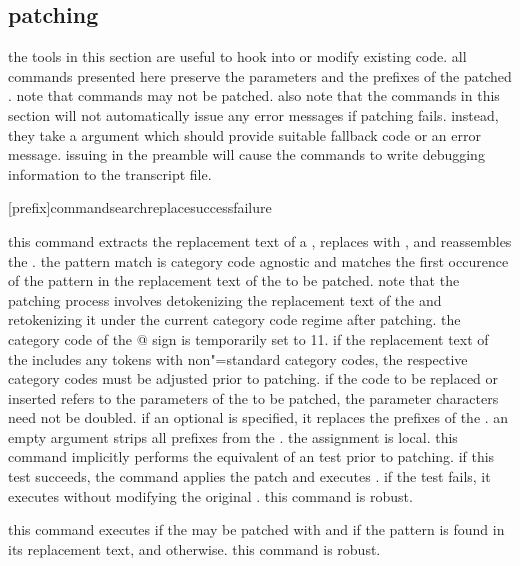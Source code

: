 \subsection{patching}
\label{aut:pat}

the tools in this section are useful to hook into or modify existing code. all commands presented here preserve the parameters and the prefixes of the patched . note that  commands may not be patched. also note that the commands in this section will not automatically issue any error messages if patching fails. instead, they take a  argument which should provide suitable fallback code or an error message. issuing  in the preamble will cause the commands to write debugging information to the transcript file.

\begin{ltxsyntax}

[prefix]{command}{search}{replace}{success}{failure}

this command extracts the replacement text of a , replaces  with , and reassembles the . the pattern match is category code agnostic and matches the first occurence of the  pattern in the replacement text of the  to be patched. note that the patching process involves detokenizing the replacement text of the  and retokenizing it under the current category code regime after patching. the category code of the @ sign is temporarily set to 11. if the replacement text of the  includes any tokens with non"=standard category codes, the respective category codes must be adjusted prior to patching. if the code to be replaced or inserted refers to the parameters of the  to be patched, the parameter characters need not be doubled. if an optional  is specified, it replaces the prefixes of the . an empty  argument strips all prefixes from the . the assignment is local. this command implicitly performs the equivalent of an  test prior to patching. if this test succeeds, the command applies the patch and executes . if the test fails, it executes  without modifying the original . this command is robust.


this command executes  if the  may be patched with  and if the  pattern is found in its replacement text, and  otherwise. this command is robust.


\end{ltxsyntax}
